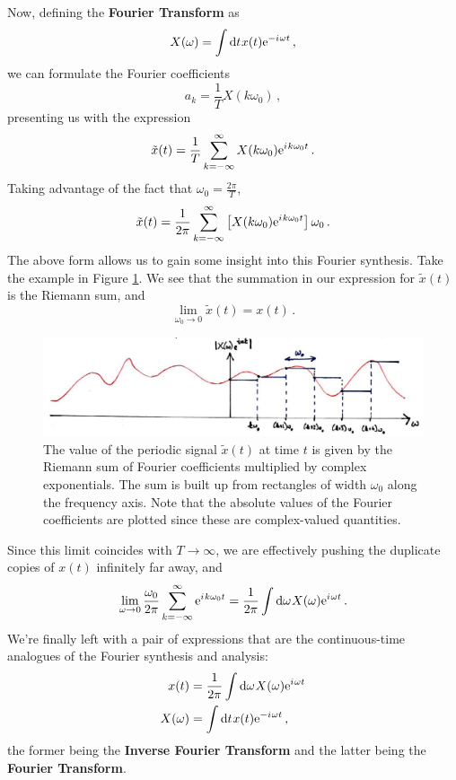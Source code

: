 %
Now, defining the \textbf{Fourier Transform} as
%
\begin{equation}
  X(\omega) = \int \mathrm{d}t\mkern1mu x(t)\mathrm{e}^{-{i\mkern1mu}\omega t} \,,
\end{equation}
%
we can formulate the Fourier coefficients
%
\begin{displaymath}
  a_k = \frac{1}{T} X(k\omega_0) \,,
\end{displaymath}
%
presenting us with the expression
%
\begin{displaymath}
  \tilde{x}(t) = \frac{1}{T}\sum_{k=-\infty}^\infty X(k\omega_0)\mathrm{e}^{{i\mkern1mu} k\omega_0 t} \,.
\end{displaymath}
%
Taking advantage of the fact that $\omega_0 = \frac{2\pi}{T}$,
%
\begin{displaymath}
  \tilde{x}(t) = \frac{1}{2\pi}\sum_{k=-\infty}^\infty \left[X(k\omega_0)\mathrm{e}^{{i\mkern1mu} k\omega_0 t}\right]\omega_0 \,.
\end{displaymath}
%
The above form allows us to gain some insight into this Fourier synthesis.
Take the example in Figure \ref{fig::lecture_5_riemann}. We see that the summation in our expression for
$\tilde{x}(t)$ is the Riemann sum, and
%
\begin{displaymath}
  \lim_{\omega_0\rightarrow 0}\tilde{x}(t) = x(t) \,.
\end{displaymath}
%
\begin{figure}[H]
  \includegraphics[width=\textwidth]{images/lecture_5_riemann.JPG}
  \caption{
    The value of the periodic signal $\tilde{x}(t)$ at time $t$ is given by the Riemann
    sum of Fourier coefficients multiplied by complex exponentials. The sum is built up
    from rectangles of width $\omega_0$ along the frequency axis. Note that the absolute
    values of the Fourier coefficients are plotted since these are complex-valued quantities.
  }
  \label{fig::lecture_5_riemann}
\end{figure}
%
Since this limit coincides with $T\rightarrow\infty$, we are effectively
pushing the duplicate copies of $x(t)$ infinitely far away, and
%
\begin{displaymath}
  \lim_{\omega\rightarrow 0}\frac{\omega_0}{2\pi}\sum_{k=-\infty}^\infty \mathrm{e}^{{i\mkern1mu} k\omega_0 t}
  = \frac{1}{2\pi}\int\mathrm{d}\omega\mkern1muX(\omega)\mathrm{e}^{{i\mkern1mu}\omega t} \,.
\end{displaymath}
%
We're finally left with a pair of expressions that are the continuous-time
analogues of the Fourier synthesis and analysis:
%
\begin{align}
  x(t) &= \frac{1}{2\pi}\int\mathrm{d}\omega\mkern1mu X(\omega)\mathrm{e}^{{i\mkern1mu}\omega t} \\
  X(\omega) &= \int\mathrm{d}t\mkern1mu x(t)\mathrm{e}^{-{i\mkern1mu}\omega t} \,,
\end{align}
%
the former being the \textbf{Inverse Fourier Transform} and the latter being
the \textbf{Fourier Transform}.

